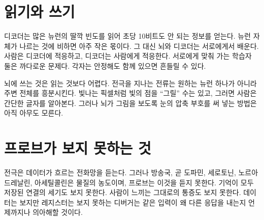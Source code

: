 \section*{읽기와 쓰기}

디코더는 많은 뉴런의 딸깍 빈도를 읽어 초당 10비트도 안 되는 정보를 얻는다. 뉴런 자체가 나르는 것에 비하면 아주 작은 몫이다. 그 대신 뇌와 디코더는 서로에게서 배운다. 사람은 디코더에 적응하고, 디코더는 사람에게 적응한다. 서로에게 맞춰 가는 학습자 둘은 까다로운 문제다. 각자는 안정해도 함께 있으면 흔들릴 수 있다.

뇌에 쓰는 것은 읽는 것보다 어렵다. 전극을 지나는 전류는 원하는 뉴런 하나가 아니라 주변 전체를 흥분시킨다. 빛나는 픽셀처럼 빛의 점을 “그릴” 수는 있고, 그러면 사람은 간단한 글자를 알아본다. 그러나 뇌가 그림을 보도록 눈의 압축 부호를 써 넣는 방법은 아직 아무도 모른다.

\section*{프로브가 보지 못하는 것}

전극은 데이터가 흐르는 전화망을 듣는다. 그러나 방송국, 곧 도파민, 세로토닌, 노르아드레날린, 아세틸콜린은 물질의 농도이며, 프로브는 이것을 듣지 못한다. 기억이 모두 저장된 연결의 세기도 보지 못한다. 사람이 느끼는 그대로의 통증도 보지 못한다. 데이터는 보지만 레지스터는 보지 못하는 디버거는 같은 입력이 왜 다른 응답을 내는지 언제까지나 의아해할 것이다.


